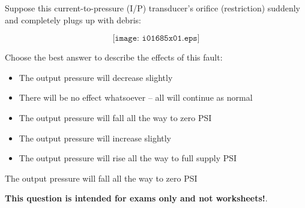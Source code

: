 

Suppose this current-to-pressure (I/P) transducer's orifice (restriction) suddenly and completely plugs up with debris:

$$\texttt{[image: i01685x01.eps]}$$

\noindent
Choose the best answer to describe the effects of this fault:

\begin{itemize}
\item{} The output pressure will decrease slightly 
\vskip 10pt
\item{} There will be no effect whatsoever -- all will continue as normal
\vskip 10pt
\item{} The output pressure will fall all the way to zero PSI
\vskip 10pt
\item{} The output pressure will increase slightly 
\vskip 10pt
\item{} The output pressure will rise all the way to full supply PSI 
\end{itemize}







The output pressure will fall all the way to zero PSI







{\bf This question is intended for exams only and not worksheets!}.



